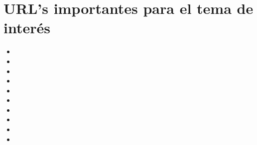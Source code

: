 \clearpage
\section{URL's importantes para el tema de interés}

\begin{itemize}
    \item \mbox{}
    \item \mbox{}
    \item \mbox{}
    \item \mbox{}
    \item \mbox{}
    \item \mbox{}
    \item \mbox{}
    \item \mbox{}
    \item \mbox{}
    \item \mbox{}
\end{itemize}
